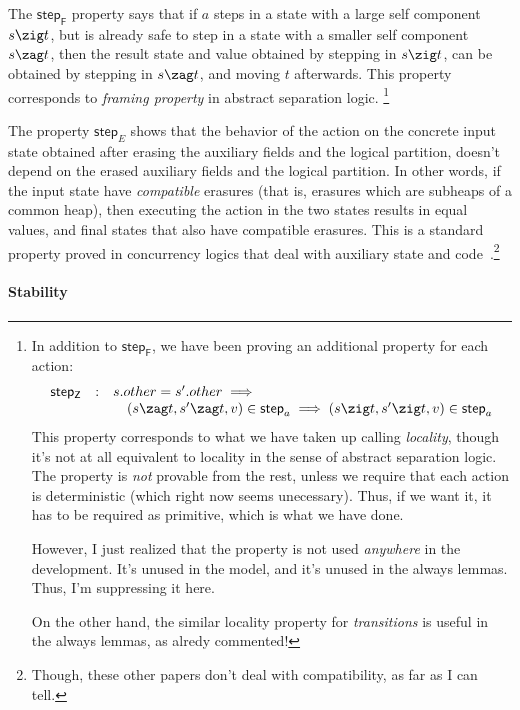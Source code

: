 The $\mathsf{step_F}$ property says that if $a$ steps in a state with
a large self component $s \zig t$, but is already safe to step in a
state with a smaller self component $s \zag t$, then the result state
and value obtained by stepping in $s \zig t$, can be obtained by
stepping in $s \zag t$, and moving $t$ afterwards. This property
corresponds to \emph{framing property} in abstract separation logic.
\footnote{In addition to $\mathsf{step_F}$, we have been proving an
  additional property for each action:
\[
\begin{array}[t]{rcl}
\mathsf{step_Z} & : & s.other = s'.other \implies \hbox{}\\
& & \quad (s \zag t, s' \zag t, v) \in \mathsf{step}_a \implies (s \zig t, s' \zig t, v) \in \mathsf{step}_a
\end{array}
\]
This property corresponds to what we have taken up calling
\emph{locality}, though it's not at all equivalent to locality in the
sense of abstract separation logic. The property is \emph{not}
provable from the rest, unless we require that each action is
deterministic (which right now seems unecessary). Thus, if we want it,
it has to be required as primitive, which is what we have done.

However, I just realized that the property is not used \emph{anywhere}
in the development. It's unused in the model, and it's unused in the
always lemmas. Thus, I'm suppressing it here.

On the other hand, the similar locality property for
\emph{transitions} is useful in the always lemmas, as alredy
commented!}

The property $\mathsf{step}_E$ shows that the behavior of the action
on the concrete input state obtained after erasing the auxiliary
fields and the logical partition, doesn't depend on the erased
auxiliary fields and the logical partition. In other words, if the
input state have \emph{compatible} erasures (that is, erasures which
are subheaps of a common heap), then executing the action in the two
states results in equal values, and final states that also have
compatible erasures. This is a standard property proved in concurrency
logics that deal with auxiliary state and
code~\cite{Owicki-Gries:CACM76,Brookes:TCS07}.\footnote{Though, these
  other papers don't deal with compatibility, as far as I can tell.}


\paragraph{Stability}

